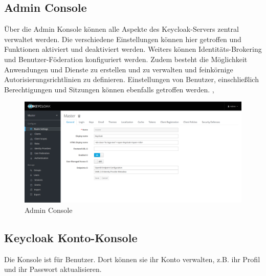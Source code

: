 \subsection{Admin Console}
Über die Admin Konsole können alle Aspekte des Keycloak-Servers zentral verwaltet werden.
Die verschiedene Einstellungen können hier getroffen und Funktionen aktiviert und deaktiviert werden. 
Weiters können Identitäts-Brokering und Benutzer-Föderation konfiguriert werden. Zudem besteht die Möglichkeit 
Anwendungen und Dienste zu erstellen und zu verwalten und feinkörnige Autorisierungsrichtlinien zu definieren.
Einstellungen von Benutzer, einschließlich Berechtigungen und Sitzungen können ebenfalls getroffen werden. \cite{noauthor_keycloak_nodate}, \cite{noauthor_server_nodate}

\begin{figure}[H]
  \includegraphics[width=1.0\textwidth]{pics/Keycloak_AdminConsole.PNG}
  \centering
  \caption{Admin Console}
\end{figure}

\subsection{Keycloak Konto-Konsole}
Die Konsole ist für Benutzer. Dort können sie ihr Konto verwalten, z.B. ihr Profil und ihr 
Passwort aktualisieren.

